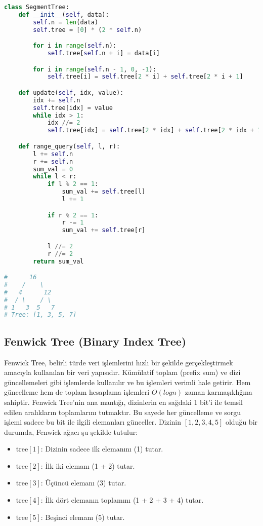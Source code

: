 \begin{lstlisting}[language=Python]
class SegmentTree:
    def __init__(self, data):
        self.n = len(data)
        self.tree = [0] * (2 * self.n)

        for i in range(self.n):
            self.tree[self.n + i] = data[i]

        for i in range(self.n - 1, 0, -1):
            self.tree[i] = self.tree[2 * i] + self.tree[2 * i + 1]

    def update(self, idx, value):
        idx += self.n
        self.tree[idx] = value
        while idx > 1:
            idx //= 2
            self.tree[idx] = self.tree[2 * idx] + self.tree[2 * idx + 1]

    def range_query(self, l, r):
        l += self.n
        r += self.n
        sum_val = 0
        while l < r:
            if l % 2 == 1:
                sum_val += self.tree[l]
                l += 1

            if r % 2 == 1:
                r -= 1
                sum_val += self.tree[r]

            l //= 2
            r //= 2
        return sum_val

#      16
#    /    \
#   4      12
#  / \    / \
# 1   3  5   7
# Tree: [1, 3, 5, 7]
\end{lstlisting}

\newpage

\subsection{Fenwick Tree (Binary Index Tree)}

Fenwick Tree, belirli türde veri işlemlerini hızlı bir şekilde gerçekleştirmek amacıyla kullanılan bir veri yapısıdır. Kümülatif toplam (prefix sum) ve dizi güncellemeleri gibi işlemlerde kullanılır ve bu işlemleri verimli hale getirir. Hem güncelleme hem de toplam hesaplama işlemleri $O(logn)$ zaman karmaşıklığına sahiptir. Fenwick Tree'nin ana mantığı, dizinlerin en sağdaki 1 bit'i ile temsil edilen aralıkların toplamlarını tutmaktır. Bu sayede her güncelleme ve sorgu işlemi sadece bu bit ile ilgili elemanları günceller. Dizinin $[1, 2, 3, 4, 5]$ olduğu bir durumda, Fenwick ağacı şu şekilde tutulur:

\begin{itemize}
    \item $\text{tree}[1]$: Dizinin sadece ilk elemanını (1) tutar.
    \item $\text{tree}[2]$: İlk iki elemanı (1 + 2) tutar.
    \item $\text{tree}[3]$: Üçüncü elemanı (3) tutar.
    \item $\text{tree}[4]$: İlk dört elemanın toplamını (1 + 2 + 3 + 4) tutar.
    \item $\text{tree}[5]$: Beşinci elemanı (5) tutar.
\end{itemize}

